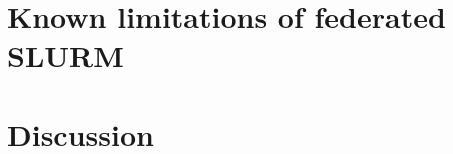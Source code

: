 \documentclass[conference]{IEEEtran}
\begin{document}



\section{Known limitations of federated SLURM}







\section{Discussion}
\end{document}
